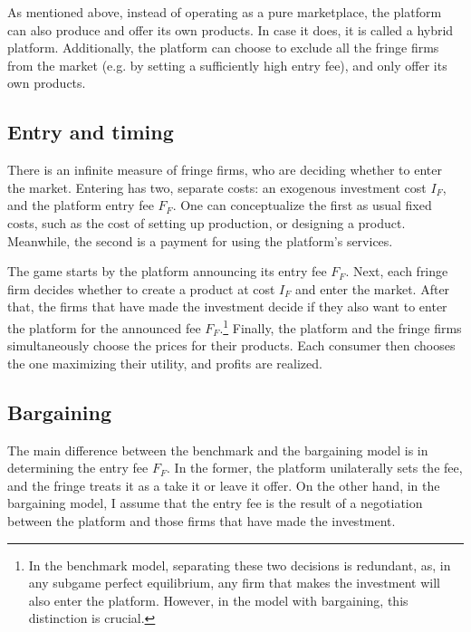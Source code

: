 \documentclass[a4paper]{article}
\begin{document}
As mentioned above, instead of operating as a pure marketplace, the platform can also produce and offer its own products.
In case it does, it is called a hybrid platform.
Additionally, the platform can choose to exclude all the fringe firms from the market (e.g. by setting a sufficiently high entry fee), and only offer its own products.  %

\subsection{Entry and timing}

There is an infinite measure of fringe firms, who are deciding whether to enter the market.
Entering has two, separate costs: an exogenous investment cost $I_F$, and the platform entry fee $F_F$.
One can conceptualize the first as usual fixed costs, such as the cost of setting up production, or designing a product.
Meanwhile, the second is a payment for using the platform's services.

The game starts by the platform announcing its entry fee $F_F$.
Next, each fringe firm decides whether to create a product at cost $I_F$ and enter the market.
After that, the firms that have made the investment decide if they also want to enter the platform for the announced fee $F_F$.\footnote{
    In the benchmark model, separating these two decisions is redundant, as, in any subgame perfect equilibrium, any firm that makes the investment will also enter the platform.
    However, in the model with bargaining, this distinction is crucial.
}
Finally, the platform and the fringe firms simultaneously choose the prices for their products.
Each consumer then chooses the one maximizing their utility, and profits are realized.

\subsection{Bargaining}

The main difference between the benchmark and the bargaining model is in determining the entry fee $F_F$.
In the former, the platform unilaterally sets the fee, and the fringe treats it as a take it or leave it offer.
On the other hand, in the bargaining model, I assume that the entry fee is the result of a negotiation between the platform and those firms that have made the investment.
\end{document}
